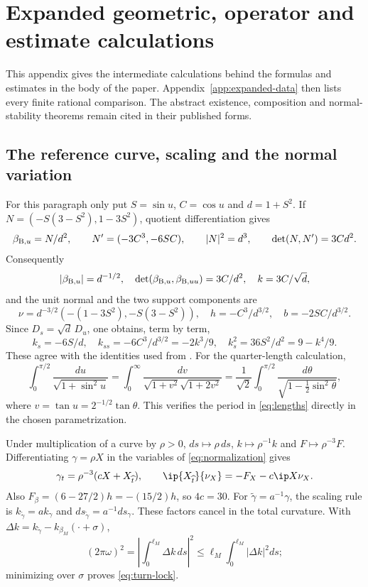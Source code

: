 \section{Expanded geometric, operator and estimate calculations}\label{app:calculations}
This appendix gives the intermediate calculations behind the formulas and
estimates in the body of the paper. Appendix~\ref{app:expanded-data} then
lists every finite rational comparison. The abstract existence, composition
and normal-stability theorems remain cited in their published forms.

\subsection{The reference curve, scaling and the normal variation}
For this paragraph only put $S=\sin u$, $C=\cos u$ and $d=1+S^2$.
If $N=(-S(3-S^2),1-3S^2)$, quotient differentiation gives
\[
 \beta_{{\rm B},u}=N/d^2,\qquad N'=(-3C^3,-6SC),
 \qquad |N|^2=d^3,\qquad \det(N,N')=3Cd^2.
\]
Consequently
\[
 |\beta_{{\rm B},u}|=d^{-1/2},\quad
 \det(\beta_{{\rm B},u},\beta_{{\rm B},uu})=3C/d^2,
 \quad k=3C/\sqrt d,
\]
and the unit normal and the two support components are
\[
 \nu=d^{-3/2}(-(1-3S^2),-S(3-S^2)),\quad
 h=-C^3/d^{3/2},\quad b=-2SC/d^{3/2}.
\]
Since $D_s=\sqrt d\,D_u$, one obtains, term by term,
\[
 k_s=-6S/d,\quad k_{ss}=-6C^3/d^{3/2}=-2k^3/9,
 \quad k_s^2=36S^2/d^2=9-k^4/9.
\]
These agree with the identities used from \cite[Section~2.2.3]{MW}.
For the quarter-length calculation,
\[
 \int_0^{\pi/2}\frac{du}{\sqrt{1+\sin^2u}}
 =\int_0^\infty\frac{dv}{\sqrt{1+v^2}\sqrt{1+2v^2}}
 =\frac1{\sqrt2}\int_0^{\pi/2}
       \frac{d\theta}{\sqrt{1-\tfrac12\sin^2\theta}},
\]
where $v=\tan u=2^{-1/2}\tan\theta$. This verifies the period in
\eqref{eq:lengths} directly in the chosen parametrization.

Under multiplication of a curve by $\rho>0$,
$ds\mapsto\rho\,ds$, $k\mapsto\rho^{-1}k$ and
$F\mapsto\rho^{-3}F$. Differentiating $\gamma=\rho X$ in the
variables of \eqref{eq:normalization} gives
\[
 \gamma_t=\rho^{-3}(cX+X_{\widehat t}),\qquad
 \ip{X_{\widehat t}}{\nu_X}=-F_X-c\ip X{\nu_X}.
\]
Also $F_\beta=(6-27/2)h=-(15/2)h$, so $4c=30$.
For $\widetilde\gamma=a^{-1}\gamma$, the scaling rule is
$k_{\widetilde\gamma}=a k_\gamma$ and
$ds_{\widetilde\gamma}=a^{-1}ds_\gamma$. These factors cancel in
the total curvature. With $\Delta k=k_{\widetilde\gamma}-k_{\beta_M}(\cdot+\sigma)$,
\[
 (2\pi\omega)^2=\left|\int_0^{\ell_M}\Delta k\,ds\right|^2
 \le\ell_M\int_0^{\ell_M}|\Delta k|^2ds;
\]
minimizing over $\sigma$ proves \eqref{eq:turn-lock}.

